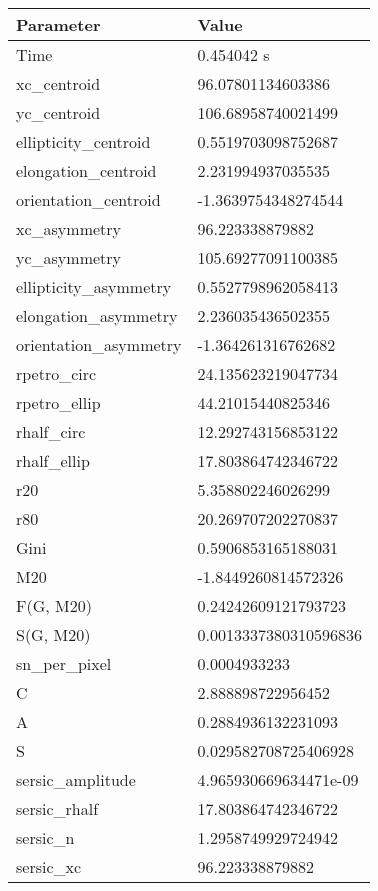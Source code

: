 \documentclass[10pt, preprint]{aastex}
\begin{document}
\begin{table}[H]
    \centering
    \begin{tabular}{ll}
        Parameter & Value \\\hline
        Time & 0.454042 s\\
        xc\_centroid & 96.07801134603386\\
        yc\_centroid & 106.68958740021499\\
        ellipticity\_centroid & 0.5519703098752687\\
        elongation\_centroid & 2.231994937035535\\
        orientation\_centroid & -1.3639754348274544\\
        xc\_asymmetry & 96.223338879882\\
        yc\_asymmetry & 105.69277091100385\\
        ellipticity\_asymmetry & 0.5527798962058413\\
        elongation\_asymmetry & 2.236035436502355\\
        orientation\_asymmetry & -1.364261316762682\\
        rpetro\_circ & 24.135623219047734\\
        rpetro\_ellip & 44.21015440825346\\
        rhalf\_circ & 12.292743156853122\\
        rhalf\_ellip & 17.803864742346722\\
        r20 & 5.358802246026299\\
        r80 & 20.269707202270837\\
        Gini & 0.5906853165188031\\
        M20 & -1.8449260814572326\\
        F(G, M20) & 0.24242609121793723\\
        S(G, M20) & 0.0013337380310596836\\
        sn\_per\_pixel & 0.0004933233\\
        C & 2.888898722956452\\
        A & 0.2884936132231093\\
        S & 0.029582708725406928\\
        sersic\_amplitude & 4.965930669634471e-09\\
        sersic\_rhalf & 17.803864742346722\\
        sersic\_n & 1.2958749929724942\\
        sersic\_xc & 96.223338879882\\

\end{tabular}
\end{table}
\end{document}
